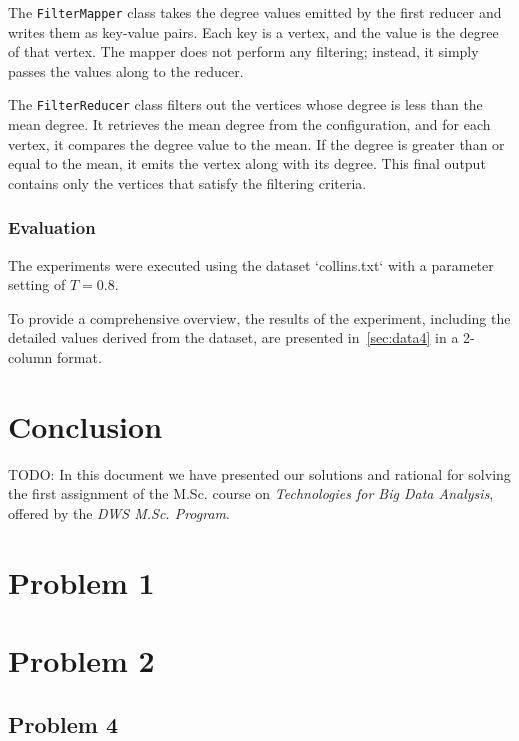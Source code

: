 \documentclass[acmlarge]{acmart}
\begin{document}
The \texttt{FilterMapper} class takes the degree values emitted by the first reducer and writes them as key-value pairs.
Each key is a vertex, and the value is the degree of that vertex.
The mapper does not perform any filtering; instead, it simply passes the values along to the reducer.

The \texttt{FilterReducer} class filters out the vertices whose degree is less than the mean degree.
It retrieves the mean degree from the configuration, and for each vertex, it compares the degree value to the mean.
If the degree is greater than or equal to the mean, it emits the vertex along with its degree.
This final output contains only the vertices that satisfy the filtering criteria.

\subsubsection{Evaluation}
The experiments were executed using the dataset `collins.txt` with a parameter setting of \( T = 0.8 \).

To provide a comprehensive overview, the results of the experiment, including the detailed values derived from the
dataset, are presented in~\autoref{sec:data4} in a 2-column format.



\section{Conclusion}
\label{sec:conclusion}
TODO: In this document we have presented our solutions and rational for solving the first assignment of the M.Sc.
course
on \emph{Technologies for Big Data Analysis}, offered by the \emph{DWS M.Sc. Program}.

\appendix
\section{Problem 1}
\label{sec:data1}


\section{Problem 2}
\label{sec:data2}


\subsection{Problem 4}
\label{sec:data4}

\end{document}
